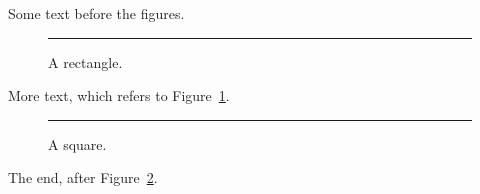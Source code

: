 \documentclass{article}
\begin{document}
Some text before the figures.

\begin{figure}[h]
  \centering
  \rule{3cm}{1cm}
  \caption{A rectangle. }
  \label{fig:rectangle}
\end{figure}

More text, which refers to Figure~\ref{fig:rectangle}.

\begin{figure}[h]
  \centering
  \rule{2cm}{2cm}
  \caption{A square.}
  \label{fig:square}
\end{figure}

The end, after Figure~\ref{fig:square}.
\end{document}
